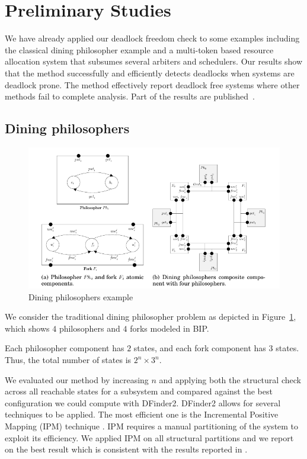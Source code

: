 \section{Preliminary Studies}

We have already applied our deadlock freedom check to some 
examples including the classical dining philosopher 
example and a multi-token based resource allocation system that
subsumes several arbiters and schedulers.
%
Our results show that the method successfully 
and efficiently detects deadlocks when systems are 
deadlock prone.
The method effectively report deadlock free systems 
where other methods fail to complete analysis. 
Part of the results are published~\cite{FORTE13}. 

\subsection{Dining philosophers}

\begin{figure}
  \includegraphics[width=1.1\textwidth]{fig/dining2}
  \caption{Dining philosophers example}\label{fig:dining}
\end{figure}

We consider the traditional dining philosopher problem as depicted in 
Figure~\ref{fig:dining}, which shows $4$ philosophers and $4$ forks modeled in BIP. 

Each philosopher component has $2$ states, and each fork component has $3$ states. 
Thus, the total number of states is $2^n \times 3^n$. 

We evaluated our method by increasing $n$ and applying both 
the structural check across all reachable states for a
subsystem and compared against the best configuration 
we could compute with DFinder2. 
DFinder2 allows for several techniques to be applied. 
The most efficient one is 
the Incremental Positive Mapping (IPM) technique \cite{DFinder2}. 
IPM requires a manual partitioning of the system to exploit its efficiency. 
We applied IPM on all structural partitions and we report on the best result which is consistent 
with the results reported in \cite{DFinder2}. 

